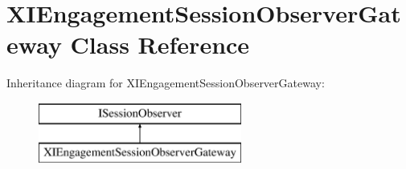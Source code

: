 \hypertarget{class_x_i_engagement_session_observer_gateway}{}\section{X\+I\+Engagement\+Session\+Observer\+Gateway Class Reference}
\label{class_x_i_engagement_session_observer_gateway}
Inheritance diagram for X\+I\+Engagement\+Session\+Observer\+Gateway\+:\begin{figure}[H]
\begin{center}
\leavevmode
\includegraphics[height=2.000000cm]{class_x_i_engagement_session_observer_gateway}
\end{center}
\end{figure}
